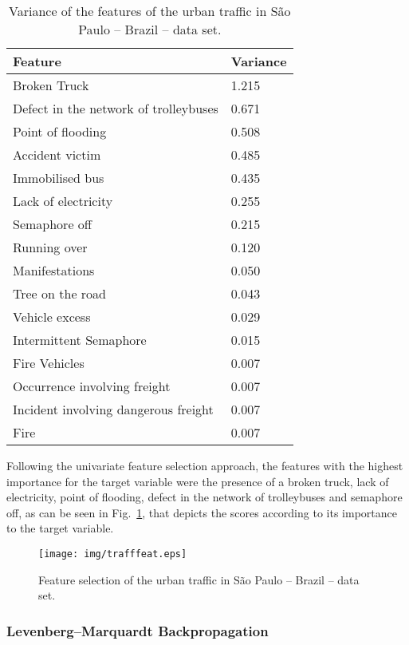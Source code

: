 \begin{table}[htbp]
\centering
\caption{Variance of the features of the urban traffic in São Paulo -- Brazil -- data set.}
\label{tab:traffvar}
\begin{tabular}{|l|l|}
\hline
\textbf{Feature} & \textbf{Variance} \\ \hline
Broken Truck & 1.215 \\ \hline
Defect in the network of trolleybuses & 0.671 \\ \hline
Point of flooding & 0.508 \\ \hline
Accident victim & 0.485 \\ \hline
Immobilised bus & 0.435 \\ \hline
Lack of electricity & 0.255 \\ \hline
Semaphore off & 0.215 \\ \hline
Running over & 0.120 \\ \hline
Manifestations & 0.050 \\ \hline
Tree on the road & 0.043 \\ \hline
Vehicle excess & 0.029 \\ \hline
Intermittent Semaphore & 0.015 \\ \hline
Fire Vehicles & 0.007 \\ \hline
Occurrence involving freight & 0.007 \\ \hline
Incident involving dangerous freight & 0.007 \\ \hline
Fire & 0.007 \\ \hline
\end{tabular}
\end{table}

Following the univariate feature selection approach, the features with the highest importance for the target variable were the presence of a broken truck, lack of electricity, point of flooding, defect in the network of trolleybuses and semaphore off, as can be seen in Fig.~\ref{fig:trafffeat}, that depicts the scores according to its importance to the target variable.

\begin{figure}[htbp]
  \centering
\texttt{[image: img/trafffeat.eps]}
  \caption{Feature selection of the urban traffic in São Paulo -- Brazil -- data set.}
  \label{fig:trafffeat}
\end{figure}

\subsubsection{Levenberg--Marquardt Backpropagation}

